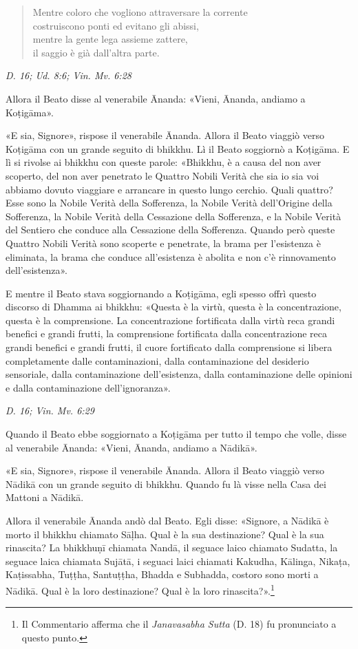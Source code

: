 \begin{quotation}
Mentre coloro che vogliono attraversare la corrente \\
costruiscono ponti ed evitano gli abissi, \\
mentre la gente lega assieme zattere, \\
il saggio è già dall’altra parte.
\end{quotation}

\emph{D. 16; Ud. 8:6; Vin. Mv. 6:28}


Allora il Beato disse al venerabile Ānanda: «Vieni, Ānanda, andiamo a
Koṭigāma».


«E sia, Signore», rispose il venerabile Ānanda. Allora il Beato viaggiò
verso Koṭigāma con un grande seguito di bhikkhu. Lì il Beato soggiornò a
Koṭigāma. E lì si rivolse ai bhikkhu con queste parole: «Bhikkhu, è a
causa del non aver scoperto, del non aver penetrato le Quattro Nobili
Verità che sia io sia voi abbiamo dovuto viaggiare e arrancare in questo
lungo cerchio. Quali quattro? Esse sono la Nobile Verità della
Sofferenza, la Nobile Verità dell’Origine della Sofferenza, la Nobile
Verità della Cessazione della Sofferenza, e la Nobile Verità del
Sentiero che conduce alla Cessazione della Sofferenza. Quando però
queste Quattro Nobili Verità sono scoperte e penetrate, la brama per
l’esistenza è eliminata, la brama che conduce all’esistenza è abolita e
non c’è rinnovamento dell’esistenza».


E mentre il Beato stava soggiornando a Koṭigāma, egli spesso offrì
questo discorso di Dhamma ai bhikkhu: «Questa è la virtù, questa è la
concentrazione, questa è la comprensione. La concentrazione fortificata
dalla virtù reca grandi benefici e grandi frutti, la comprensione
fortificata dalla concentrazione reca grandi benefici e grandi frutti,
il cuore fortificato dalla comprensione si libera completamente dalle
contaminazioni, dalla contaminazione del desiderio sensoriale, dalla
contaminazione dell’esistenza, dalla contaminazione delle opinioni e
dalla contaminazione dell’ignoranza».


\emph{D. 16; Vin. Mv. 6:29}


Quando il Beato ebbe soggiornato a Koṭigāma per tutto il tempo che
volle, disse al venerabile Ānanda: «Vieni, Ānanda, andiamo a Nādikā».


«E sia, Signore», rispose il venerabile Ānanda. Allora il Beato viaggiò
verso Nādikā con un grande seguito di bhikkhu. Quando fu là visse nella
Casa dei Mattoni a Nādikā.


Allora il venerabile Ānanda andò dal Beato. Egli disse: «Signore, a
Nādikā è morto il bhikkhu chiamato Sāḷha. Qual è la sua destinazione?
Qual è la sua rinascita? La bhikkhuṇī chiamata Nandā, il seguace laico
chiamato Sudatta, la seguace laica chiamata Sujātā, i seguaci laici
chiamati Kakudha, Kālinga, Nikaṭa, Kaṭissabha, Tuṭṭha, Santuṭṭha, Bhadda
e Subhadda, costoro sono morti a Nādikā. Qual è la loro destinazione?
Qual è la loro rinascita?».\footnote{Il Commentario afferma che il \emph{Janavasabha Sutta} (D. 18) fu pronunciato a questo punto.}


